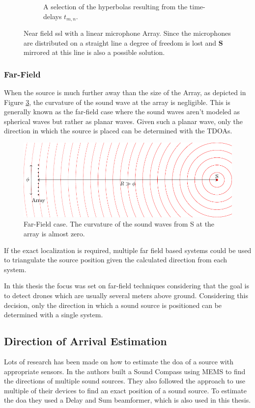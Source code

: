 \begin{figure}[ht]
\begin{subfigure}[b]{0.45\textwidth}
		\caption{A selection of the hyperbolas resulting from the time-delays $t_{m,n}$.}
		\label{ssl:fig:hyperbola}
	\end{subfigure}
	\caption{Near field \acrshort{ssl} with a linear microphone Array.
		Since the microphones are distributed on a straight line a degree of freedom is lost and
		$\bm{S}$ mirrored at this line is also a possible solution.}
	\label{fig:three graphs}
\end{figure}

\subsubsection{Far-Field}
When the source is much further away than the size of the Array, as depicted
in Figure \ref{ssl:fig:far field}, the curvature of the sound wave at the array is negligible.
This is generally known as the far-field case where the sound waves aren't
modeled as spherical waves but rather as planar waves.
Given such a planar wave, only the direction in which the source is placed can be determined with the TDOAs.

\begin{figure}[ht]
	\centering
	\includegraphics[]{images/3_source_localization/FarField.pdf}
	\caption{Far-Field case. The curvature of the sound waves from S at the array
		is almost zero.}
	\label{ssl:fig:far field}
\end{figure}

If the exact localization is required, multiple far field based systems could be
used to triangulate the source position given the calculated direction from each system.

In this thesis the focus was set on far-field techniques considering that the
goal is to detect drones which are usually several meters above ground.
Considering this decision, only the direction in which a sound source is positioned
can be determined with a single system.
\newpage
\subsection{Direction of Arrival Estimation}
Lots of research has been made on how to estimate the \acrfull{doa} of a source
with appropriate sensors.
In \cite{s140201918} the authors built a Sound Compass
using MEMS to find the directions of multiple sound sources.
They also followed the approach to use multiple of their devices to
find an exact position of a sound source.
To estimate the \acrshort{doa} they used a Delay and Sum beamformer,
which is also used in this thesis.

